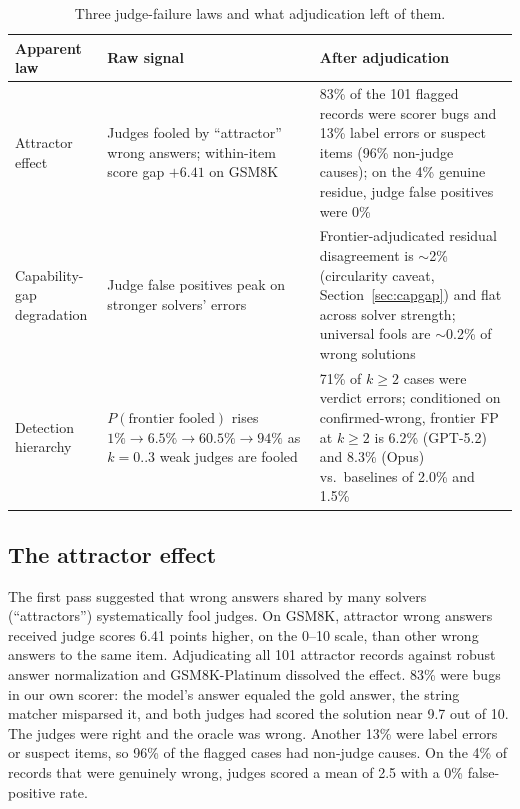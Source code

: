 \documentclass[11pt]{article}
\begin{document}
\begin{table}[t]
\centering
\small
\begin{tabular}{@{}p{3.1cm}p{4.6cm}p{5.6cm}@{}}
\toprule
Apparent law & Raw signal & After adjudication \\
\midrule
Attractor effect & Judges fooled by ``attractor'' wrong answers; within-item score gap $+6.41$ on GSM8K & 83\% of the 101 flagged records were scorer bugs and 13\% label errors or suspect items (96\% non-judge causes); on the 4\% genuine residue, judge false positives were 0\% \\
\addlinespace
Capability-gap degradation & Judge false positives peak on stronger solvers' errors & Frontier-adjudicated residual disagreement is $\sim$2\% (circularity caveat, Section~\ref{sec:capgap}) and flat across solver strength; universal fools are $\sim$0.2\% of wrong solutions \\
\addlinespace
Detection hierarchy & $P(\text{frontier fooled})$ rises $1\%\!\to\!6.5\%\!\to\!60.5\%\!\to\!94\%$ as $k=0..3$ weak judges are fooled & 71\% of $k\ge2$ cases were verdict errors; conditioned on confirmed-wrong, frontier FP at $k\ge2$ is 6.2\% (GPT-5.2) and 8.3\% (Opus) vs.\ baselines of 2.0\% and 1.5\% \\
\bottomrule
\end{tabular}
\caption{Three judge-failure laws and what adjudication left of them.}
\label{tab:laws}
\end{table}

\subsection{The attractor effect}

The first pass suggested that wrong answers shared by many solvers (``attractors'') systematically fool judges.
On GSM8K, attractor wrong answers received judge scores 6.41 points higher, on the 0--10 scale, than other wrong answers to the same item.
Adjudicating all 101 attractor records against robust answer normalization and GSM8K-Platinum dissolved the effect.
83\% were bugs in our own scorer: the model's answer equaled the gold answer, the string matcher misparsed it, and both judges had scored the solution near 9.7 out of 10.
The judges were right and the oracle was wrong.
Another 13\% were label errors or suspect items, so 96\% of the flagged cases had non-judge causes.
On the 4\% of records that were genuinely wrong, judges scored a mean of 2.5 with a 0\% false-positive rate.
\end{document}
